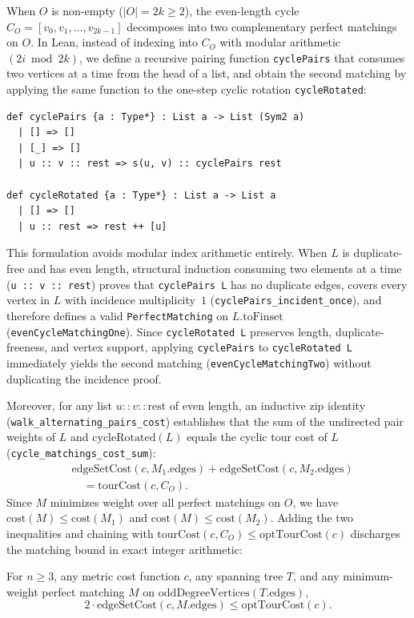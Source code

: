 When $O$ is non-empty ($|O| = 2k \ge 2$), the even-length cycle $C_O = [v_0, v_1, \dots, v_{2k-1}]$ decomposes into two complementary perfect matchings on $O$. In Lean, instead of indexing into $C_O$ with modular arithmetic $(2i \bmod 2k)$, we define a recursive pairing function \texttt{cyclePairs} that consumes two vertices at a time from the head of a list, and obtain the second matching by applying the same function to the one-step cyclic rotation \texttt{cycleRotated}:

\noindent\begin{minipage}{\linewidth}
\begin{lstlisting}[language=lean4]
def cyclePairs {a : Type*} : List a -> List (Sym2 a)
  | [] => []
  | [_] => []
  | u :: v :: rest => s(u, v) :: cyclePairs rest

def cycleRotated {a : Type*} : List a -> List a
  | [] => []
  | u :: rest => rest ++ [u]
\end{lstlisting}
\end{minipage}
This formulation avoids modular index arithmetic entirely. When $L$ is duplicate-free and has even length, structural induction consuming two elements at a time (\texttt{u :: v :: rest}) proves that \texttt{cyclePairs L} has no duplicate edges, covers every vertex in $L$ with incidence multiplicity~$1$ (\texttt{cyclePairs\_incident\_once}), and therefore defines a valid \texttt{PerfectMatching} on $L.\mathrm{toFinset}$ (\texttt{evenCycleMatchingOne}). Since \texttt{cycleRotated L} preserves length, duplicate-freeness, and vertex support, applying \texttt{cyclePairs} to \texttt{cycleRotated L} immediately yields the second matching (\texttt{evenCycleMatchingTwo}) without duplicating the incidence proof.

Moreover, for any list $u :: v :: \mathrm{rest}$ of even length, an inductive zip identity (\texttt{walk\_alternating\_pairs\_cost}) establishes that the sum of the undirected pair weights of $L$ and $\mathrm{cycleRotated}(L)$ equals the cyclic tour cost of $L$ (\texttt{cycle\_matchings\_cost\_sum}):
\begin{equation}
\begin{aligned}
  &\mathrm{edgeSetCost}(c, M_1.\mathrm{edges}) + \mathrm{edgeSetCost}(c, M_2.\mathrm{edges}) \\
  &\quad = \mathrm{tourCost}(c, C_O).
\end{aligned}
\end{equation}
Since $M$ minimizes weight over all perfect matchings on $O$, we have $\mathrm{cost}(M) \le \mathrm{cost}(M_1)$ and $\mathrm{cost}(M) \le \mathrm{cost}(M_2)$. Adding the two inequalities and chaining with $\mathrm{tourCost}(c, C_O) \le \mathrm{optTourCost}(c)$ discharges the matching bound in exact integer arithmetic:
\begin{theorem}
For $n \ge 3$, any metric cost function $c$, any spanning tree $T$, and any minimum-weight perfect matching $M$ on $\mathrm{oddDegreeVertices}(T.\mathrm{edges})$,
\[
  2 \cdot \mathrm{edgeSetCost}(c, M.\mathrm{edges}) \le \mathrm{optTourCost}(c).
\]
\end{theorem}

